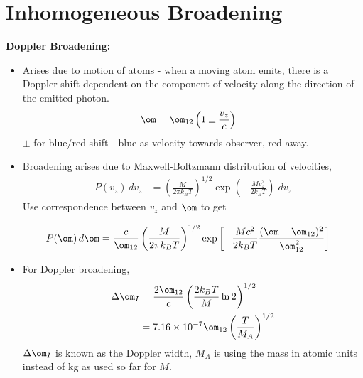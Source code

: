 \documentclass[a4paper, 11pt, normalem]{report}
\begin{document}
\section{Inhomogeneous Broadening}
\textbf{Doppler Broadening:}
\begin{itemize}
    \item Arises due to motion of atoms - when a moving atom emits, there is a Doppler shift dependent on the component of velocity along the direction of the emitted photon.
        \begin{align}
            \om &= \om_{12}\left(1 \pm \frac{v_z}{c}\right)
        \end{align}
        $\pm$ for blue/red shift - blue as velocity towards observer, red away.
    \item Broadening arises due to Maxwell-Boltzmann distribution of velocities,
        \begin{align}
            P(v_z)\,dv_z &= \left(\frac{M}{2\pi k_BT}\right)^{1/2} \exp\left(-\frac{Mv_z^2}{2k_BT}\right)\;dv_z
        \end{align}
        Use correspondence between $v_z$ and $\om$ to get
        \begin{figure}[H]
            \centering
        \end{figure}
        \begin{align}
            P(\om)\,d\om &= \frac{c}{\om_{12}}\left(\frac{M}{2\pi k_BT}\right)^{1/2}\exp\left[-\frac{Mc^2}{2k_B T}\frac{(\om-\om_{12})^2}{\om_{12}^2}\right]
        \end{align}
    \item For Doppler broadening,
        \begin{align}
            \Delta\om_I &= \frac{2\om_{12}}{c}\left(\frac{2k_BT}{M}\ln2\right)^{1/2} \\
                        &= 7.16\times10^{-7}\om_{12}\left(\frac{T}{M_A}\right)^{1/2}
        \end{align}
        $\Delta\om_I$ is known as the Doppler width, $M_A$ is using the mass in atomic units instead of kg as used so far for $M$.
\end{itemize}
\end{document}
